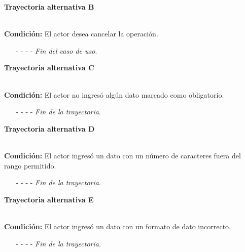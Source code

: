 \hypertarget{CU7-1-2:TAB}{\textbf{Trayectoria alternativa B}}\\
\noindent \textbf{Condición:} El actor desea cancelar la operación.
\begin{enumerate}
	\UCpaso[\UCactor] Solicita cancelar la operación oprimiendo el botón  de la pantalla 
	\UCpaso[\UCsist] Muestra la pantalla .
	\item[- -] - - {\em {Fin del caso de uso}}.%
\end{enumerate}
\hypertarget{CU7-1-2:TAC}{\textbf{Trayectoria alternativa C}}\\
\noindent \textbf{Condición:} El actor no ingresó algún dato marcado como obligatorio.
\begin{enumerate}
	\UCpaso[\UCsist] Muestra el mensaje  señalando el campo que presenta el error en la pantalla .
	\UCpaso Regresa al paso \ref{CU7.1.2-P4} de la trayectoria principal.
	\item[- -] - - {\em {Fin de la trayectoria}}.%
\end{enumerate}
\hypertarget{CU7-1-2:TAD}{\textbf{Trayectoria alternativa D}}\\
\noindent \textbf{Condición:} El actor ingresó un dato con un número de caracteres fuera del rango permitido.
\begin{enumerate}
	\UCpaso[\UCsist] Muestra el mensaje  señalando el campo que presenta el error en la pantalla .
	\UCpaso Regresa al paso \ref{CU7.1.2-P4} de la trayectoria principal.
	\item[- -] - - {\em {Fin de la trayectoria}}.%
\end{enumerate}
\hypertarget{CU7-1-2:TAE}{\textbf{Trayectoria alternativa E}}\\
\noindent \textbf{Condición:} El actor ingresó un dato con un formato de dato incorrecto.
\begin{enumerate}
	\UCpaso[\UCsist] Muestra el mensaje  señalando el campo que presenta el error en la pantalla .
	\UCpaso Regresa al paso \ref{CU7.1.2-P4} de la trayectoria principal.
	\item[- -] - - {\em {Fin de la trayectoria}}.
\end{enumerate}
